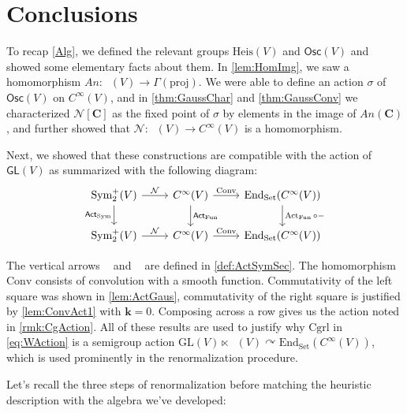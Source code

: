 \documentclass[12pt]{article}
\theoremstyle{definition}
\theoremstyle{plain}
\newcommand{\Symp}{\mathop{\mathrm{Sym}_2^+}}
\newcommand{\ActSym}
{\mathop{\mathrm{Act}_{\mathrm{Sym}}}}
\newcommand{\ActFun}
{\mathop{\mathrm{Act}_{\mathrm{Fun}}}}
\begin{document}
\section{Conclusions}\label{sec:conclusions}

To recap \autoref{Alg}, we defined the relevant groups $\mathrm{Heis}(V)$ and $\mathsf{Osc}(V)$ and showed some elementary facts about them. In \autoref{lem:HomImg}, we saw a homomorphism $An:\Symp(V) \to \Gamma(\mathrm{proj})$. 
We were able to define an action $\sigma$ of $\mathsf{Osc}(V)$ on $C^\infty(V)$, and in \autoref{thm:GaussChar} and \autoref{thm:GaussConv} we characterized $\mathcal{N}[\mathbf{C}]$ as the fixed point of $\sigma$ by elements in the image of $An(\mathbf{C})$, and further showed that $\mathcal{N}:\Symp(V)\to C^\infty(V)$ is a homomorphism.

Next, we showed that these constructions are compatible with the action of \(\mathsf{GL}(V)\) as summarized with the following diagram:
\begin{equation}
\begin{tikzcd}
\Symp(V) \ar[r, "\mathcal{N}"] \ar[d, "\mathsf{Act}_\mathrm{Sym}"'] & C^\infty(V) \ar[r, "\textrm{Conv}"] \ar[d, "\mathsf{Act}_{\mathrm{Fun}}"] & \mathrm{End}_\text{Set}(C^\infty(V)) \ar[d, "\ActFun\circ -"] \\
\Symp(V) \ar[r, "\mathcal{N}"] & C^\infty(V) \ar[r, "\textrm{Conv}"] & \mathrm{End}_\text{Set}(C^\infty(V))
\end{tikzcd}
\end{equation}

The vertical arrows $\ActSym$ and $\ActFun$ are defined in \autoref{def:ActSymSec}. The homomorphism \(\mathrm{Conv}\) consists of convolution with a smooth function.
Commutativity of the left square was shown in \autoref{lem:ActGaus}, commutativity of the right square is justified by \autoref{lem:ConvAct1} with $\mathbf{k}=0$. 
Composing across a row gives us the action noted in \autoref{rmk:CgAction}.
All of these results are used to justify why $\mathrm{Cgrl}$ in \autoref{eq:WAction} is a semigroup action $\mathrm{GL}(V)\ltimes \Symp(V)\curvearrowright \mathrm{End}_\text{Set}(C^\infty(V))$, which is used prominently in the renormalization procedure.

Let's recall the three steps of renormalization before matching the heuristic description with the algebra we've developed:
\end{document}
